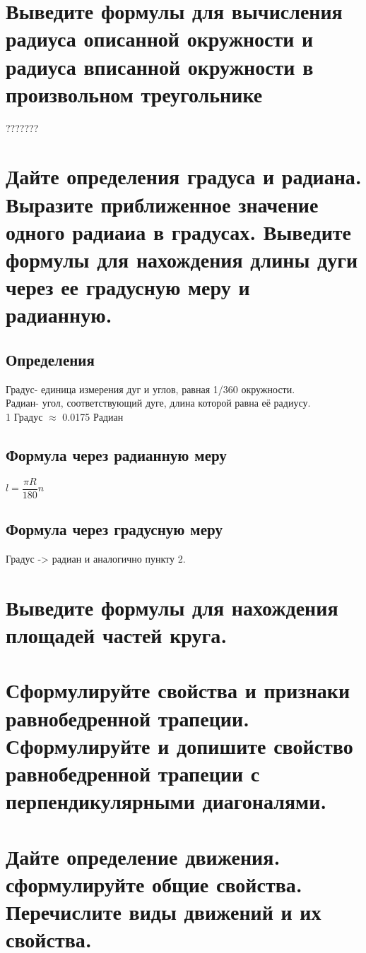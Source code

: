 \documentclass[12pt, letterpaper]{article}
\begin{document}
\section {Выведите формулы для вычисления радиуса описанной окружности и радиуса вписанной окружности в произвольном треугольнике}
???????

\section {Дайте определения градуса и радиана. Выразите приближенное значение одного радиаиа в градусах. Выведите формулы для нахождения длины дуги через ее градусную меру и радианную.}
\subsection{Определения}
Градус- единица измерения дуг и углов, равная 1/360 окружности. \\
Радиан- угол, соответствующий дуге, длина которой равна её радиусу. \\
1 Градус $\approx$ 0.0175 Радиан \\
\subsection{Формула через радианную меру}
$ l=\dfrac{\pi R}{180} n $ \\
\subsection{Формула через градусную меру}
Градус -> радиан и аналогично пункту 2. \\ 


\section {Выведите формулы для нахождения площадей частей круга. }

\section {Сформулируйте свойства и признаки равнобедренной трапеции. Сформулируйте и допишите свойство равнобедренной трапеции с перпендикулярными диагоналями.}

\section {Дайте определение движения. сформулируйте общие свойства. Перечислите виды движений и их свойства.}
\end{document}
